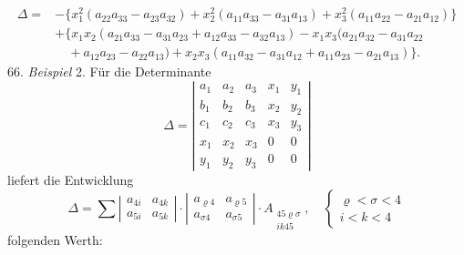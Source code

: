 \documentclass[11pt]{article}
\providecommand{\weberpage}[1]{}
\let\Delta\varDelta
\begin{document}
\weberpage{72}
\[
\begin{aligned}
\Delta ={}& -\{x_1^{2}(a_{22}a_{33}-a_{23}a_{32})+x_2^{2}(a_{11}a_{33}-a_{31}a_{13})+x_3^{2}(a_{11}a_{22}-a_{21}a_{12})\}\\
&+\{x_1x_2(a_{21}a_{33}-a_{31}a_{23}+a_{12}a_{33}-a_{32}a_{13})-x_1x_3(a_{21}a_{32}-a_{31}a_{22}\\
&\quad +a_{12}a_{23}-a_{22}a_{13})+x_2x_3(a_{11}a_{32}-a_{31}a_{12}+a_{11}a_{23}-a_{21}a_{13})\}.
\end{aligned}
\]
66. \textit{Beispiel} 2. Für die Determinante
\[
\Delta = \left|\begin{array}{ccccc}
a_1 & a_2 & a_3 & x_1 & y_1\\
b_1 & b_2 & b_3 & x_2 & y_2\\
c_1 & c_2 & c_3 & x_3 & y_3\\
x_1 & x_2 & x_3 & 0 & 0\\
y_1 & y_2 & y_3 & 0 & 0
\end{array}\right|
\]
liefert die Entwicklung
\[
\Delta = \sum \left|\begin{array}{cc} a_{4i} & a_{4k}\\ a_{5i} & a_{5k}\end{array}\right|\cdot \left|\begin{array}{cc} a_{\varrho4} & a_{\varrho5}\\ a_{\sigma4} & a_{\sigma5}\end{array}\right|\cdot A_{\substack{45\varrho\sigma\\ik45}},\quad \left\{\begin{array}{l}\varrho<\sigma<4\\ i<k<4\end{array}\right.
\]
folgenden Werth:
\end{document}
